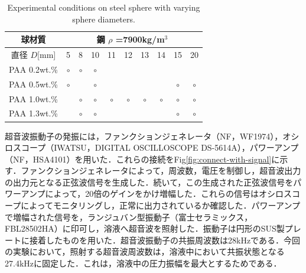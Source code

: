 \begin{table}[H]
    \centering
    \caption{Experimental conditions on steel sphere with varying sphere diameters.}
    \label{table:exp-conditions-dia}
    \begin{tabular}{c|c|c|c|c|c|c|c|c|c}\hline
        球材質       & \multicolumn{9}{|c}{鋼 $\rho$ =7900kg/m$^3$}                                                                                 \\ \hline
        直径 $D$[mm] & 5                                            & 8       & 10      & 11      & 12      & 13      & 14      & 15      & 20      \\ \hline \hline
        PAA 0.2wt.\% & $\circ$                                      & $\circ$ & $\circ$ &         &         &         &         &         &         \\ \hline
        PAA 0.5wt.\% & $\circ$                                      &         & $\circ$ &         &         &         &         & $\circ$ & $\circ$ \\ \hline
        PAA 1.0wt.\% &                                              & $\circ$ & $\circ$ & $\circ$ & $\circ$ & $\circ$ & $\circ$ & $\circ$ & $\circ$ \\ \hline
        PAA 1.3wt.\% &                                              & $\circ$ & $\circ$ &         &         &         &         & $\circ$ & $\circ$ \\ \hline
    \end{tabular}
\end{table}

超音波振動子の発振には，ファンクションジェネレータ（NF，WF1974），オシロスコープ（IWATSU，DIGITAL OSCILLOSCOPE DS-5614A），パワーアンプ（NF，HSA4101）を用いた．これらの接続をFig\ref{fig:connect-with-signal}に示す．ファンクションジェネレータによって，周波数，電圧を制御し，超音波出力の出力元となる正弦波信号を生成した．続いて，この生成された正弦波信号をパワーアンプによって，20倍のゲインをかけ増幅した．これらの信号はオシロスコープによってモニタリングし，正常に出力されているか確認した．パワーアンプで増幅された信号を，ランジュバン型振動子（富士セラミックス，FBL28502HA）に印可し，溶液へ超音波を照射した．振動子は円形のSUS製プレートに接着したものを用いた．超音波振動子の共振周波数は28kHzである．今回の実験において，照射する超音波周波数は，溶液中において共振状態となる27.4kHzに固定した．これは，溶液中の圧力振幅を最大とするためである．

